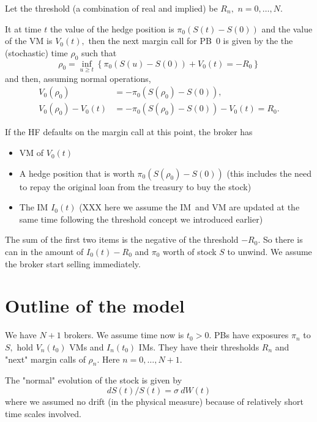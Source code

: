 \documentclass{article}
\begin{document}
Let the threshold (a combination of real and implied) be $R_{n},$ $n=0,\dots
,N.$

It at time $t$ the value of the hedge position is $\pi _{0}\left(
S(t)-S(0)\right) $ and the value of the VM is $V_{0}(t),$ then the next
margin call for PB\ $0$ is given by the the (stochastic) time $\rho _{0}$
such that%
\[
\rho _{0}=\inf_{u\geq t}\left\{ \pi _{0}\left( S(u)-S(0)\right)
+V_{0}(t)=-R_{0}\right\} 
\]%
and then, assuming normal operations, 
\begin{align*}
V_{0}(\rho _{0})& =-\pi _{0}\left( S(\rho _{0})-S(0)\right) , \\
V_{0}(\rho _{0})-V_{0}(t)& =-\pi _{0}\left( S(\rho _{0})-S(0)\right)
-V_{0}(t)=R_{0}.
\end{align*}

If the HF defaults on the margin call at this point, the broker has

\begin{itemize}
\item VM of $V_{0}(t)$

\item A hedge position that is worth $\pi _{0}\left( S(\rho
_{0})-S(0)\right) $ (this includes the need to repay the original loan from
the treasury to buy the stock)

\item The IM $I_{0}(t)$ (XXX here we assume the IM\ and VM are updated at
the same time following the threshold concept we introduced earlier)
\end{itemize}

The sum of the first two items is the negative of the threshold $-R_{0}$. So
there is can in the amount of $I_{0}(t)-R_{0}$ and $\pi _{0}$ worth of stock 
$S$ to unwind. We assume the broker start selling immediately. 

\section{Outline of the model}

We have $N+1$ brokers. We assume time now is $t_{0}>0.$ PBs have exposures $%
\pi _{n}$ to $S,$ hold $V_{n}(t_{0})$ VMs and $I_{n}(t_{0})$ IMs. They have
their thresholds $R_{n}$ and "next" margin calls of $\rho _{n}.$ Here $%
n=0,\dots ,N+1.$ 

The "normal" evolution of the stock is given by 
\[
dS(t)/S(t)=\sigma ~dW(t)
\]%
where we assumed no drift (in the physical measure) because of relatively
short time scales involved. 
\end{document}
